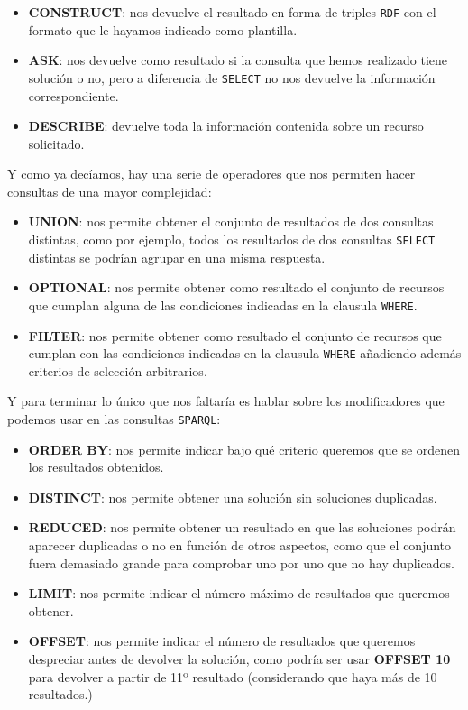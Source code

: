 \begin{itemize}
	\item \textbf{CONSTRUCT}: nos devuelve el resultado en forma de triples {\tt RDF} con el formato que le hayamos indicado como plantilla.
	\item \textbf{ASK}: nos devuelve como resultado si la consulta que hemos realizado tiene solución o no, pero a diferencia de {\tt SELECT} no nos devuelve la información correspondiente.
	\item \textbf{DESCRIBE}: devuelve toda la información contenida sobre un recurso solicitado.
\end{itemize}

Y como ya decíamos, hay una serie de operadores que nos permiten hacer consultas de una mayor complejidad:

\begin{itemize}
	\item \textbf{UNION}: nos permite obtener el conjunto de resultados de dos consultas distintas, como por ejemplo, todos los resultados de dos consultas {\tt SELECT} distintas se podrían agrupar en una misma respuesta.
	\item \textbf{OPTIONAL}: nos permite obtener como resultado el conjunto de recursos que cumplan alguna de las condiciones indicadas en la clausula {\tt WHERE}.
	\item \textbf{FILTER}: nos permite obtener como resultado el conjunto de recursos que cumplan con las condiciones indicadas en la clausula {\tt WHERE} añadiendo además criterios de selección arbitrarios.
\end{itemize}

Y para terminar lo único que nos faltaría es hablar sobre los modificadores que podemos usar en las consultas {\tt SPARQL}:

\begin{itemize}
	\item \textbf{ORDER BY}: nos permite indicar bajo qué criterio queremos que se ordenen los resultados obtenidos.
	\item \textbf{DISTINCT}: nos permite obtener una solución sin soluciones duplicadas.
	\item \textbf{REDUCED}: nos permite obtener un resultado en que las soluciones podrán aparecer duplicadas o no en función de otros aspectos, como que el conjunto fuera demasiado grande para comprobar uno por uno que no hay duplicados.
	\item \textbf{LIMIT}: nos permite indicar el número máximo de resultados que queremos obtener.
	\item \textbf{OFFSET}: nos permite indicar el número de resultados que queremos despreciar antes de devolver la solución, como podría ser usar \textbf{OFFSET 10} para devolver a partir de 11º resultado (considerando que haya más de 10 resultados.)
\end{itemize}

